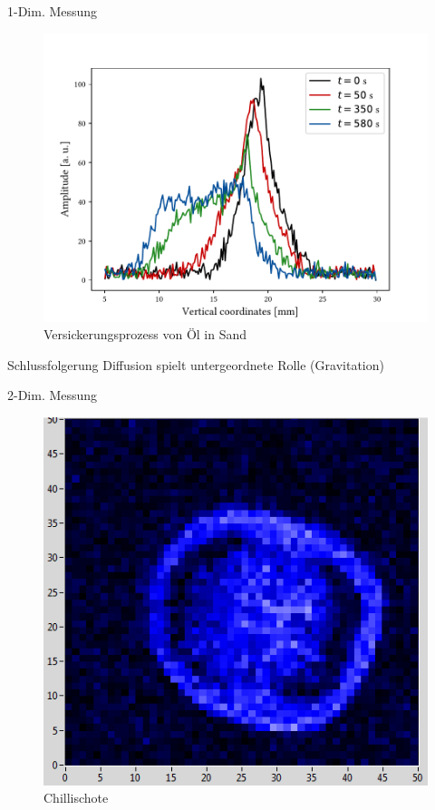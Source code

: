 \begin{frame}{1-Dim. Messung}
	\begin{figure}
	\centering
	\includegraphics[scale=.35]{..//figures//f61_abb_9.pdf}
	\caption{Versickerungsprozess von Öl in Sand}
	\end{figure}
	\begin{block}{Schlussfolgerung}
	Diffusion spielt untergeordnete Rolle (Gravitation)
	\end{block}
\end{frame}

\begin{frame}{2-Dim. Messung}
	\begin{figure}
	\centering
	\includegraphics[scale=.5]{..//figures//chilipepper.png}
	\caption{Chillischote}
	\end{figure}
\end{frame}

